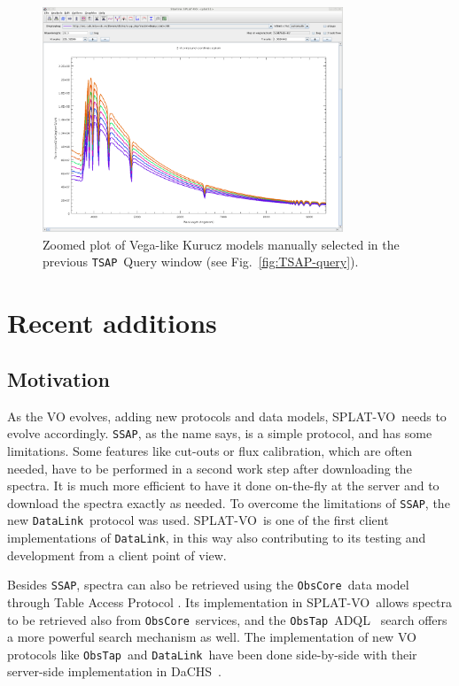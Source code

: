 \documentclass[final,authoryear,5p,times,twocolumn]{elsarticle}
\newcommand{\datalink}{\texttt{DataLink}}
\newcommand{\ssap}{\texttt{SSAP}}
\newcommand{\tsap}{\texttt{TSAP}}
\newcommand{\obstap}{\texttt{ObsTap}}
\newcommand{\obscore}{\texttt{ObsCore}}
\newcommand{\adql}{ADQL}
\newcommand{\splatvo}{{\textsf{\small{SPLAT-VO}}}}
\newcommand{\dachs}{\textsf{\small DaCHS}}
\begin{document}
\begin{figure}[t]
\begin{center}
\includegraphics[width=0.8\textwidth]{TSSA-plot.pdf} \caption{Zoomed plot of
Vega-like Kurucz models manually selected in the previous
\tsap\ Query window (see Fig.~\ref{fig:TSAP-query}). }
\label{fig:TSAP-plot}
\end{center}
\end{figure}

\section{Recent additions}
%
\subsection{Motivation}
%
As the VO evolves, adding new protocols and data models, \splatvo\ needs to
evolve accordingly.  \ssap, as the name says, is a simple protocol, and has
some limitations. Some features like cut-outs or flux calibration, which are
often needed, have to be performed in a second work step after downloading the
spectra. It is much more efficient to have it done on-the-fly at the server and
to download the spectra exactly as needed. To overcome the limitations of
\ssap, the new \datalink\ protocol \citep{datalink} was used. \splatvo\ is one
of the first client implementations of \datalink, in this way also contributing
to its testing and development from a client point of view.

Besides \ssap, spectra can also be retrieved using the \obscore\ data model
through Table Access Protocol  \citep[known as \obstap;][]{obstap}. Its
implementation in \splatvo\ allows spectra to be retrieved also from \obscore\
services, and the \obstap\ \adql\ \citep{adql} search offers a more powerful
search mechanism as well. The implementation of new VO protocols like \obstap\
and \datalink\ have been done side-by-side with their server-side
implementation in \dachs\ \citep[Data Center Helper Suite;][]{dachs}.
\end{document}
